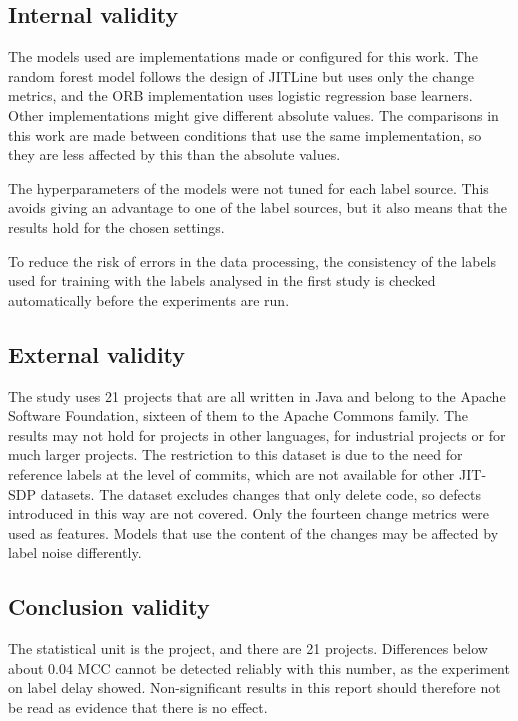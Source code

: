 \documentclass[12pt,a4paper,oneside]{report}
\begin{document}
\subsection{Internal validity}

The models used are implementations made or configured for this work. The
random forest model follows the design of JITLine but uses only the change
metrics, and the ORB implementation uses logistic regression base learners.
Other implementations might give different absolute values. The comparisons
in this work are made between conditions that use the same implementation,
so they are less affected by this than the absolute values.

The hyperparameters of the models were not tuned for each label source. This
avoids giving an advantage to one of the label sources, but it also means
that the results hold for the chosen settings.

To reduce the risk of errors in the data processing, the consistency of the
labels used for training with the labels analysed in the first study is
checked automatically before the experiments are run.

\subsection{External validity}

The study uses 21 projects that are all written in Java and belong to the
Apache Software Foundation, sixteen of them to the Apache Commons family.
The results may not hold for projects in other languages, for industrial
projects or for much larger projects. The restriction to this dataset is due
to the need for reference labels at the level of commits, which are not
available for other JIT-SDP datasets. The dataset excludes changes that only
delete code, so defects introduced in this way are not covered. Only the
fourteen change metrics were used as features. Models that use the content of
the changes may be affected by label noise differently.

\subsection{Conclusion validity}

The statistical unit is the project, and there are 21 projects. Differences
below about 0.04 MCC cannot be detected reliably with this number, as the
experiment on label delay showed. Non-significant results in this report
should therefore not be read as evidence that there is no effect.
\end{document}
